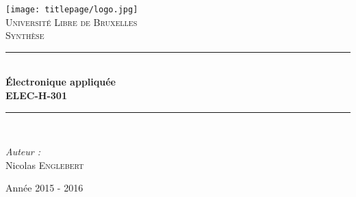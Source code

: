 \AddToShipoutPicture*{\BackgroundPic}
\begin{titlepage}
	\begin{center}	
			
		\newcommand{\HRule}{\rule{\linewidth}{0.5mm}}   			            %
		\texttt{[image: titlepage/logo.jpg]}~\\[1cm]				%
			
			\textsc{\LARGE Université Libre de Bruxelles}\\[1.5cm]
			\textsc{\Large Synthèse}\\[0.5cm]
			
			\HRule \\[0.4cm]
			{ \huge \bfseries Électronique appliquée \ \\ELEC-H-301 \\[0.4cm] }
			
			
			\HRule \\[1.5cm]
			\begin{minipage}{0.4\textwidth}
				\begin{flushleft} \large
							
					\emph{Auteur :}\\
					Nicolas \textsc{Englebert}
					
				\end{flushleft}
			\end{minipage}
			\begin{minipage}{0.4\textwidth}
				\begin{flushright} \large
				\end{flushright}
			\end{minipage}
			
			\vfill
			
			{\large Année 2015 - 2016}
			
		\end{center}
	\end{titlepage}
